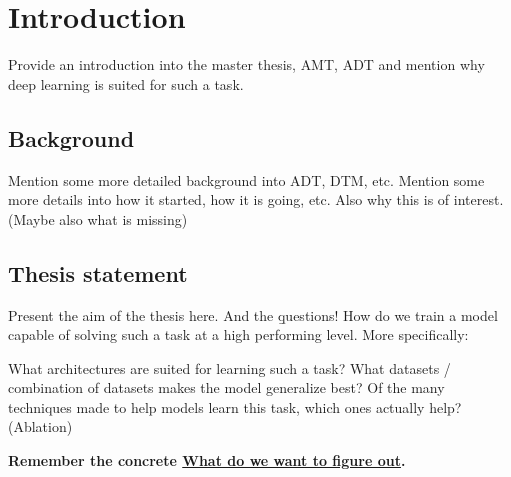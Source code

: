 \chapter{Introduction}

Provide an introduction into the master thesis, \gls{AMT}, \gls{ADT} and mention why deep learning is suited for such a task.

\section{Background}

Mention some more detailed background into \gls{ADT}, \gls{DTM}, etc.
Mention some more details into how it started, how it is going, etc.
Also why this is of interest. (Maybe also what is missing)

\section{Thesis statement}

Present the aim of the thesis here. And the \b{questions!}
How do we train a model capable of solving such a task at a high performing level. More specifically:

What architectures are suited for learning such a task?
What datasets / combination of datasets makes the model generalize best?
Of the many techniques made to help models learn this task, which ones actually help? (Ablation)

\textbf{Remember the concrete \underline{What do we want to figure out}.}